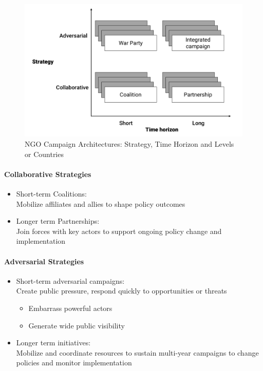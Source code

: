 \documentclass[11pt]{article}
\theoremstyle{definition}
\begin{document}
\begin{figure}[H]
	\centering
	\includegraphics[width=0.8\linewidth]{img/ngo_campaign_architecture}
	\caption{NGO Campaign Architectures: Strategy, Time Horizon and Levels or Countries}
	\label{fig:ngocampaignarchitecture}
\end{figure}

\paragraph{Collaborative Strategies}
\begin{itemize}
	\item Short-term Coalitions:\\
	Mobilize affiliates and allies to shape policy outcomes
	\item Longer term Partnerships:\\
	Join forces with key actors to support ongoing policy change and implementation
\end{itemize}

\paragraph{Adversarial Strategies}
\begin{itemize}
	\item Short-term adversarial campaigns:\\
	Create public pressure, respond quickly to opportunities or threats
	\begin{itemize}
		\item Embarrass powerful actors
		\item Generate wide public visibility
	\end{itemize}
	\item Longer term initiatives:\\
	Mobilize and coordinate resources to sustain multi-year campaigns to change policies and monitor implementation
\end{itemize}
\end{document}
